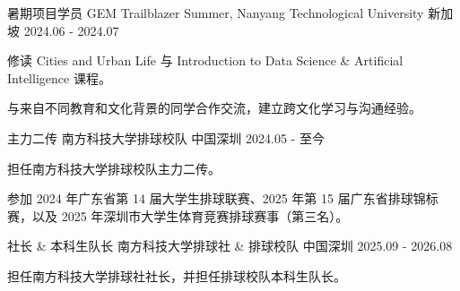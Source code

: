 

\begin{cventries}

  \cventry
    {暑期项目学员}
    {GEM Trailblazer Summer, Nanyang Technological University}
    {新加坡}
    {2024.06 - 2024.07}
    {
      \begin{cvitems}
        \item {修读 Cities and Urban Life 与 Introduction to Data Science \& Artificial Intelligence 课程。}
        \item {与来自不同教育和文化背景的同学合作交流，建立跨文化学习与沟通经验。}
      \end{cvitems}
    }

  \cventry
    {主力二传}
    {南方科技大学排球校队}
    {中国深圳}
    {2024.05 - 至今}
    {
      \begin{cvitems}
        \item {担任南方科技大学排球校队主力二传。}
        \item {参加 2024 年广东省第 14 届大学生排球联赛、2025 年第 15 届广东省排球锦标赛，以及 2025 年深圳市大学生体育竞赛排球赛事（第三名）。}
      \end{cvitems}
    }

  \cventry
    {社长 \& 本科生队长}
    {南方科技大学排球社 \& 排球校队}
    {中国深圳}
    {2025.09 - 2026.08}
    {
      \begin{cvitems}
        \item {担任南方科技大学排球社社长，并担任排球校队本科生队长。}
      \end{cvitems}
    }

\end{cventries}
